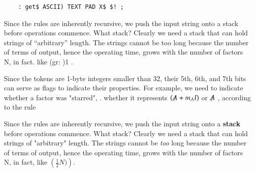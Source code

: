 \begin{lstlisting}
    : get$ ASCII) TEXT PAD X$ $! ;
\end{lstlisting}

Since the rules are inherently recursive, we push the input string onto a stack before operations commence. What stack? Clearly we need a stack that can hold strings of “arbitrary” length. The strings cannot be too long because the number of terms of output, hence the operating time, grows with the number of factors N, in fact. like (gr: )1 .

	




Since the tokens are 1-byte integers smaller than 32, their 5th, 6th, and 7th bits can serve as flags to indicate their properties. For example, we need to indicate whether a factor was "starred", \ie. whether it represents $(\tr{A} + m_{A}I)$ or $\tr{A}$ , according to the rule

Since the rules are inherently recursive, we push the input string onto a \textbf{stack} before operations commence. What stack? Clearly we need a stack that can hold strings of "arbitrary" length. The strings cannot be \textit{too} long because the number of terms of output, hence the operating time, grows with the number of factors N, in fact, like $\left(\frac{1}{2}N)\right)$\bc{!}.

